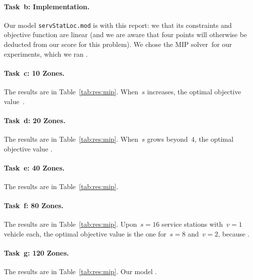 \paragraph{Task~b: Implementation.}
Our model \texttt{servStatLoc.mod} is  with this
report: we  that its constraints and objective function
are linear (and we are aware that four points will otherwise be
deducted from our score for this problem).
%
We chose the MIP solver~\SolverMIP for our experiments, which we ran
.

\paragraph{Task~c: 10 Zones.}
The results are in Table~\ref{tab:res:mip}.
%
When~$s$ increases, the optimal objective value~\todo{\filler}.

\paragraph{Task~d: 20 Zones.}
The results are in Table~\ref{tab:res:mip}.
%
When~$s$ grows beyond~$4$, the optimal objective value \todo{\filler}.

\paragraph{Task~e: 40 Zones.}
The results are in Table~\ref{tab:res:mip}.

\paragraph{Task~f: 80 Zones.}
The results are in Table~\ref{tab:res:mip}.
%
Upon~$s=16$ service stations with~$v=1$ vehicle each, the optimal
objective value is \todo{\filler} the one for~$s=8$ and~$v=2$, because
\todo{\filler}.

\paragraph{Task~g: 120 Zones.}
The results are in Table~\ref{tab:res:mip}.
%
Our model .

